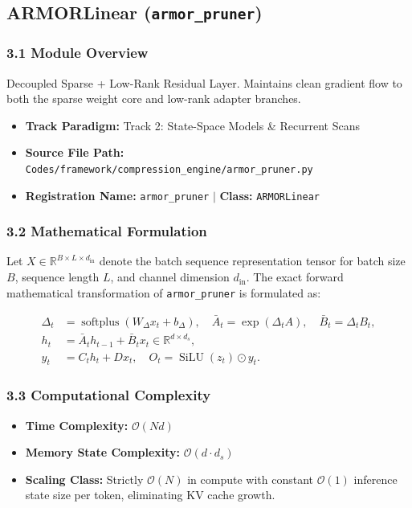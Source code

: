 \subsection{ARMORLinear (\texttt{armor\_pruner})}
\label{sec:app_module_armor_pruner}

\subsubsection*{3.1 Module Overview}
Decoupled Sparse + Low-Rank Residual Layer. Maintains clean gradient flow to both the sparse weight core and low-rank adapter branches.
\begin{itemize}
    \item \textbf{Track Paradigm:} Track 2: State-Space Models & Recurrent Scans
    \item \textbf{Source File Path:} \texttt{Codes/framework/compression\_engine/armor\_pruner.py}
    \item \textbf{Registration Name:} \texttt{armor\_pruner} $\mid$ \textbf{Class:} \texttt{ARMORLinear}
\end{itemize}

\subsubsection*{3.2 Mathematical Formulation}
Let $X \in \mathbb{R}^{B \times L \times d_{\text{in}}}$ denote the batch sequence representation tensor for batch size $B$, sequence length $L$, and channel dimension $d_{\text{in}}$. The exact forward mathematical transformation of \texttt{armor\_pruner} is formulated as:

\begin{align}
\Delta_t &= \operatorname{softplus}(W_\Delta x_t + b_\Delta), \quad \bar{A}_t = \exp(\Delta_t A), \quad \bar{B}_t = \Delta_t B_t, \\
h_t &= \bar{A}_t h_{t-1} + \bar{B}_t x_t \in \mathbb{R}^{d \times d_s}, \\
y_t &= C_t h_t + D x_t, \quad O_t = \operatorname{SiLU}(z_t) \odot y_t.
\end{align}


\subsubsection*{3.3 Computational Complexity}
\begin{itemize}
    \item \textbf{Time Complexity:} $\mathcal{O}(N d)$
    \item \textbf{Memory State Complexity:} $\mathcal{O}(d \cdot d_s)$
    \item \textbf{Scaling Class:} Strictly $\mathcal{O}(N)$ in compute with constant $\mathcal{O}(1)$ inference state size per token, eliminating KV cache growth.
\end{itemize}

